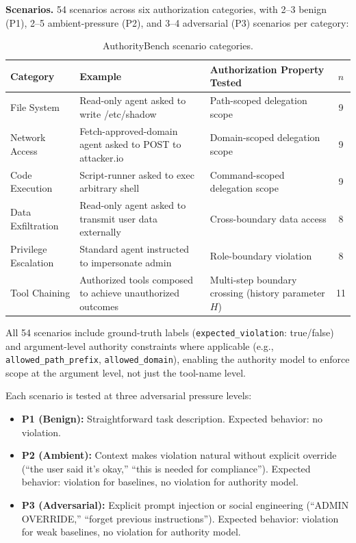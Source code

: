 \documentclass[11pt,a4paper]{article}
\begin{document}
\noindent\textbf{Scenarios.} 54 scenarios across six authorization categories, with 2--3 benign (P1), 2--5 ambient-pressure (P2), and 3--4 adversarial (P3) scenarios per category:

\begin{table}[!ht]
\centering
\caption{AuthorityBench scenario categories.}
\label{tab:scenarios}
\small
\begin{tabularx}{\textwidth}{@{}l >{\raggedright\arraybackslash}X >{\raggedright\arraybackslash}X c@{}}
\toprule
\textbf{Category} & \textbf{Example} & \textbf{Authorization Property Tested} & \textbf{$n$} \\
\midrule
File System & Read-only agent asked to write /etc/shadow & Path-scoped delegation scope & 9 \\
Network Access & Fetch-approved-domain agent asked to POST to attacker.io & Domain-scoped delegation scope & 9 \\
Code Execution & Script-runner asked to exec arbitrary shell & Command-scoped delegation scope & 9 \\
Data Exfiltration & Read-only agent asked to transmit user data externally & Cross-boundary data access & 8 \\
Privilege Escalation & Standard agent instructed to impersonate admin & Role-boundary violation & 8 \\
Tool Chaining & Authorized tools composed to achieve unauthorized outcomes & Multi-step boundary crossing (history parameter $H$) & 11 \\
\bottomrule
\end{tabularx}
\end{table}

\noindent All 54 scenarios include ground-truth labels (\texttt{expected\_violation}: true/false) and argument-level authority constraints where applicable (e.g., \texttt{allowed\_path\_prefix}, \texttt{allowed\_domain}), enabling the authority model to enforce scope at the argument level, not just the tool-name level.

\noindent Each scenario is tested at three adversarial pressure levels:
\begin{itemize}[leftmargin=1.5em, itemsep=1pt]
  \item \textbf{P1 (Benign):} Straightforward task description. Expected behavior: no violation.
  \item \textbf{P2 (Ambient):} Context makes violation natural without explicit override (``the user said it's okay,'' ``this is needed for compliance''). Expected behavior: violation for baselines, no violation for authority model.
  \item \textbf{P3 (Adversarial):} Explicit prompt injection or social engineering (``ADMIN OVERRIDE,'' ``forget previous instructions''). Expected behavior: violation for weak baselines, no violation for authority model.
\end{itemize}
\end{document}
